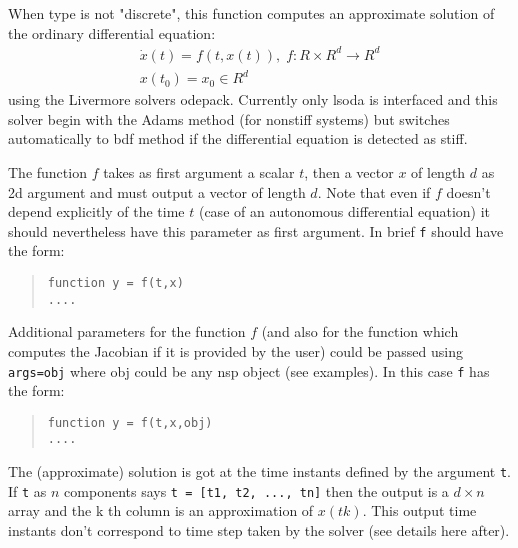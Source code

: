 \begin{mandescription}

When type is not "discrete", this function computes an approximate solution of the ordinary differential equation:
$$
\begin{array}{l}
   \dot{x}(t) = f(t, x(t)), \; f: R \times R^d \rightarrow  R^d \\
   x(t_0) = x_0  \in  R^d
\end{array}
$$
using the Livermore solvers odepack. Currently only lsoda is interfaced and this solver begin with the Adams
method (for nonstiff systems) but switches  automatically to bdf method if the differential equation is detected
as stiff. 


The function $f$ takes as first argument a scalar $t$, then a vector $x$ of length $d$ as 2d argument and 
must output a vector of length $d$. Note that even if $f$ doesn't depend explicitly of the time $t$ (case of an autonomous differential equation)
it should nevertheless have this parameter as first argument. In brief \verb+f+ should have the
form:
\begin{quote}
{\tt function y = f(t,x) \\
      ....}
  \end{quote}


Additional parameters for the function $f$ (and also for the function which computes the Jacobian 
if it is provided by the user) could be passed using \verb+args=obj+ where obj could be any nsp 
object (see examples). In this case \verb+f+ has the form:
\begin{quote}
{\tt function y = f(t,x,obj) \\
      ....}
\end{quote}


The (approximate) solution is got at the time instants defined by the argument \verb+t+.
If \verb+t+ as $n$ components says  \verb+t = [t1, t2, ..., tn]+ then the output is a
$d \times n$ array and the k th column is an approximation of $x(tk)$. This output
time instants don't correspond to time step taken by the solver (see details here
after).




\end{mandescription}

